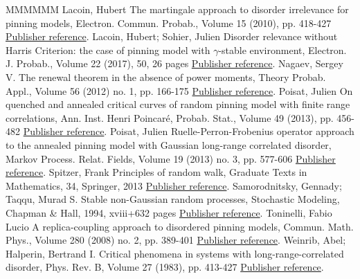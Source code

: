 \begin{thebibliography}{MMMMMM}
 Lacoin, Hubert The martingale approach to disorder irrelevance for pinning models, Electron. Commun. Probab., Volume 15 (2010), pp. 418-427 \href{https://ahl.centre-mersenne.org/item/AHL_2019__2__281_0/#L10}{Publisher reference}.
 Lacoin, Hubert; Sohier, Julien Disorder relevance without Harris Criterion: the case of pinning model with \(\gamma\)-stable environment, Electron. J. Probab., Volume 22 (2017), 50, 26 pages \href{https://ahl.centre-mersenne.org/item/AHL_2019__2__281_0/#LS16+}{Publisher reference}.
 Nagaev, Sergey V. The renewal theorem in the absence of power moments, Theory Probab. Appl., Volume 56 (2012) no. 1, pp. 166-175 \href{https://ahl.centre-mersenne.org/item/AHL_2019__2__281_0/#Na2012}{Publisher reference}.
 Poisat, Julien On quenched and annealed critical curves of random pinning model with finite range correlations, Ann. Inst. Henri Poincaré, Probab. Stat., Volume 49 (2013), pp. 456-482 \href{https://ahl.centre-mersenne.org/item/AHL_2019__2__281_0/#P13a}{Publisher reference}.
 Poisat, Julien Ruelle-Perron-Frobenius operator approach to the annealed pinning model with Gaussian long-range correlated disorder, Markov Process. Relat. Fields, Volume 19 (2013) no. 3, pp. 577-606 \href{https://ahl.centre-mersenne.org/item/AHL_2019__2__281_0/#P13}{Publisher reference}.
 Spitzer, Frank Principles of random walk, Graduate Texts in Mathematics, 34, Springer, 2013 \href{https://ahl.centre-mersenne.org/item/AHL_2019__2__281_0/#Spitzer}{Publisher reference}.
 Samorodnitsky, Gennady; Taqqu, Murad S. Stable non-Gaussian random processes, Stochastic Modeling, Chapman \& Hall, 1994, xviii+632 pages \href{https://ahl.centre-mersenne.org/item/AHL_2019__2__281_0/#ST94}{Publisher reference}.
 Toninelli, Fabio Lucio A replica-coupling approach to disordered pinning models, Commun. Math. Phys., Volume 280 (2008) no. 2, pp. 389-401 \href{https://ahl.centre-mersenne.org/item/AHL_2019__2__281_0/#T08}{Publisher reference}.
 Weinrib, Abel; Halperin, Bertrand I. Critical phenomena in systems with long-range-correlated disorder, Phys. Rev. B, Volume 27 (1983), pp. 413-427 \href{https://ahl.centre-mersenne.org/item/AHL_2019__2__281_0/#WH83}{Publisher reference}.
\end{thebibliography}

